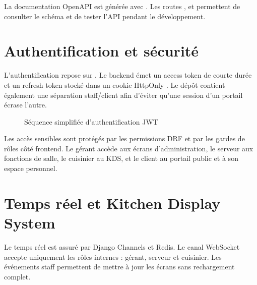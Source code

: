 La documentation OpenAPI est générée avec . Les routes ,  et  permettent de consulter le schéma et de tester l'API pendant le développement.

\section{Authentification et sécurité}
L'authentification repose sur . Le backend émet un access token de courte durée et un refresh token stocké dans un cookie HttpOnly \cite{simplejwt}. Le dépôt contient également une séparation staff/client afin d'éviter qu'une session d'un portail écrase l'autre.

\begin{figure}[H]
\centering
{}
\caption{Séquence simplifiée d'authentification JWT}
\label{fig:auth-jwt}
\end{figure}

Les accès sensibles sont protégés par les permissions DRF et par les gardes de rôles côté frontend. Le gérant accède aux écrans d'administration, le serveur aux fonctions de salle, le cuisinier au KDS, et le client au portail public et à son espace personnel.

\section{Temps réel et Kitchen Display System}
Le temps réel est assuré par Django Channels et Redis. Le canal WebSocket  accepte uniquement les rôles internes : gérant, serveur et cuisinier. Les événements staff permettent de mettre à jour les écrans sans rechargement complet.

